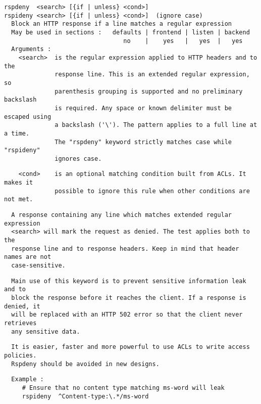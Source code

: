 \begin{verbatim}
rspdeny  <search> [{if | unless} <cond>]
rspideny <search> [{if | unless} <cond>]  (ignore case)
  Block an HTTP response if a line matches a regular expression
  May be used in sections :   defaults | frontend | listen | backend
                                 no    |    yes   |   yes  |   yes
  Arguments :
    <search>  is the regular expression applied to HTTP headers and to the
              response line. This is an extended regular expression, so
              parenthesis grouping is supported and no preliminary backslash
              is required. Any space or known delimiter must be escaped using
              a backslash ('\'). The pattern applies to a full line at a time.
              The "rspdeny" keyword strictly matches case while "rspideny"
              ignores case.
\end{verbatim}

\begin{verbatim}
    <cond>    is an optional matching condition built from ACLs. It makes it
              possible to ignore this rule when other conditions are not met.
\end{verbatim}

\begin{verbatim}
  A response containing any line which matches extended regular expression
  <search> will mark the request as denied. The test applies both to the
  response line and to response headers. Keep in mind that header names are not
  case-sensitive.
\end{verbatim}

\begin{verbatim}
  Main use of this keyword is to prevent sensitive information leak and to
  block the response before it reaches the client. If a response is denied, it
  will be replaced with an HTTP 502 error so that the client never retrieves
  any sensitive data.
\end{verbatim}

\begin{verbatim}
  It is easier, faster and more powerful to use ACLs to write access policies.
  Rspdeny should be avoided in new designs.
\end{verbatim}

\begin{verbatim}
  Example :
     # Ensure that no content type matching ms-word will leak
     rspideny  ^Content-type:\.*/ms-word
\end{verbatim}


